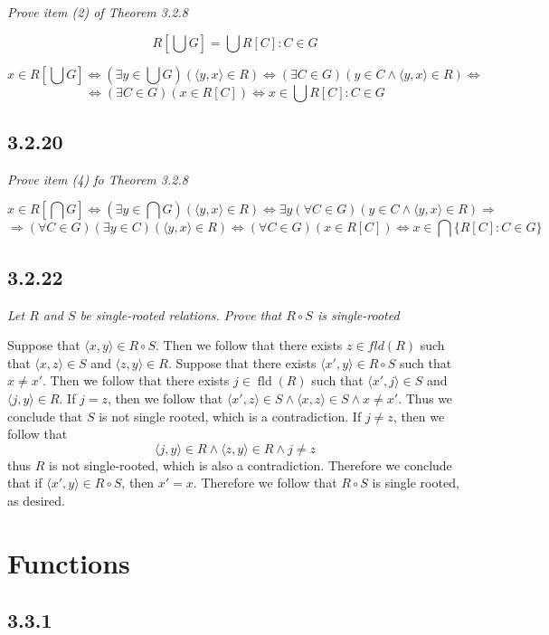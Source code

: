 \documentclass[11pt,oneside,titlepage]{book}
\DeclareMathOperator \fld {fld}
\DeclareMathOperator \lra {\Leftrightarrow}
\DeclareMathOperator \ra {\Rightarrow}
\newcommand{\eangle}[1]{\langle #1 \rangle}
\begin{document}
\textit{Prove item (2) of Theorem 3.2.8}

$$R[\bigcup G] = \bigcup{R[C]: C \in G}$$

$$x \in R[\bigcup G] \lra (\exists y \in \bigcup G)(\eangle{y, x} \in R) \lra
(\exists C \in G)(y \in C \land \eangle{y, x} \in R) \lra$$
$$\lra (\exists C \in G)(x \in R[C]) \lra x \in \bigcup{R[C]: C \in G}$$

\subsection*{3.2.20}

\textit{Prove item (4) fo Theorem 3.2.8}

$$x \in R[\bigcap G] \lra (\exists y \in \bigcap G)(\eangle{y, x} \in R) \lra
\exists y (\forall C \in  G)( y \in C \land \eangle{y, x} \in R) \ra$$
$$ \ra
(\forall C \in G) (\exists y \in C) ( \eangle{y, x} \in R) \lra
(\forall C \in G) (x \in R[C]) \lra x \in \bigcap{\{R[C]: C \in G\}}$$

\subsection*{3.2.22}

\textit{Let $R$ and $S$ be single-rooted relations. Prove that $R \circ S$ is
  single-rooted}

Suppose that $\eangle{x, y} \in R \circ S$. Then we follow that there exists $z \in
fld(R)$ such that
$\eangle{x, z} \in S$ and $\eangle{z, y} \in R$. Suppose that there exists  $\eangle{x', y} \in
R \circ S$ such that $x \neq x'$. Then we follow that there exists $j \in \fld(R)$ such that
$\eangle{x', j} \in S$ and $\eangle{j, y} \in R$. If $j = z$, then we follow that
$\eangle{x', z} \in S \land \eangle{x, z} \in S \land x \neq x'$. Thus we conclude that $S$ is not
single rooted, which is a contradiction. If $j \neq z$, then we follow that
$$\eangle{j, y} \in R \land \eangle{z, y} \in R \land j \neq z$$
thus $R$ is not single-rooted, which is also a contradiction. Therefore we conclude that
if $\eangle{x', y} \in R \circ S$, then $x' = x$. Therefore we follow that $R \circ S$ is
single rooted, as desired.

\section{Functions}

\subsection*{3.3.1}
\end{document}

